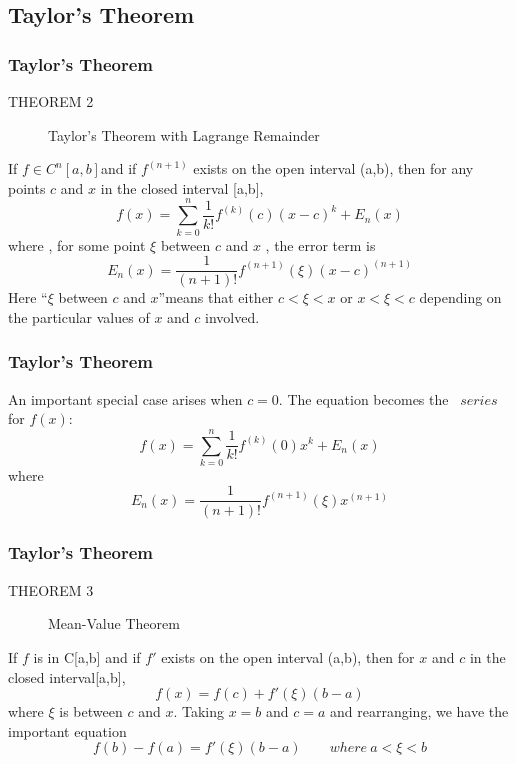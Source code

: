 \documentclass[notheorems,mathserif,table,compress]{beamer}  %
\begin{document}
\subsection{Taylor's Theorem}
\begin{frame}
  \frametitle{Taylor's Theorem}
\begin{description}
\item[THEOREM 2] \textsf{Taylor's Theorem with Lagrange Remainder}
\end{description}
If $f \in C^ n [a,b] $and if $f^{(n+1)}$ exists on the open interval (a,b), then for any points $c$  and $x$ in the closed interval [a,b], 
\begin{displaymath}
f(x)=\sum_{k=0}^n \frac{1}{k!}f^{(k)}(c)(x-c)^k +E_n(x)
\end{displaymath}
where , for some point $\xi$ between $c$ and $x$ , the error term is
\begin{displaymath}
E_n(x)=\frac{1}{(n+1)!}f^{(n+1)}(\xi)(x-c)^{(n+1)}
\end{displaymath}
Here ``$\xi$ between $c$ and $x$''means that either $c <\xi < x$ or $x < \xi <c$
depending on the particular values of $x$ and $c$ involved.
\end{frame}

\begin{frame}
  \frametitle{Taylor's Theorem}
An important special case arises when $c=0$. The equation becomes the \mbox{ {$series$}} for $f(x)$:
\begin{displaymath}
f(x)=\sum_{k=0}^n \frac{1}{k!}f^{(k)}(0)x^k +E_n(x)
\end{displaymath}
where 
\begin{displaymath}
E_n(x)=\frac{1}{(n+1)!}f^{(n+1)}(\xi)x^{(n+1)}
\end{displaymath}
\end{frame}

\begin{frame}
  \frametitle{Taylor's Theorem}
\begin{description}
\item[THEOREM 3] \textsf{Mean-Value Theorem}
\end{description}
If $f$ is in C[a,b] and if $f'$ exists on the open interval (a,b), then for $x$ and $c$ in the closed interval[a,b],
\begin{displaymath}
f(x)=f(c)+f'(\xi)(b-a)
\end{displaymath}
where $\xi$ is between $c$ and $x$.
Taking $x=b$ and $c=a$ and rearranging, we have the important equation
\begin{displaymath}
f(b)-f(a)=f'(\xi)(b-a) \qquad where\: a<\xi<b
\end{displaymath}
\end{frame}
\end{document}
